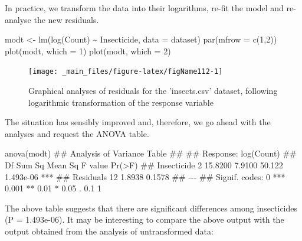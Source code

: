 \documentclass[a4paper,12pt,oneside]{book}
\newenvironment{Shaded}{\begin{snugshade}}{\end{snugshade}}
\newcommand{\DecValTok}[1]{#1}
\newcommand{\SpecialCharTok}[1]{#1}
\newcommand{\DocumentationTok}[1]{#1}
\newcommand{\OtherTok}[1]{#1}
\newcommand{\FunctionTok}[1]{#1}
\newcommand{\AttributeTok}[1]{#1}
\newcommand{\NormalTok}[1]{#1}
\begin{document}
In practice, we transform the data into their logarithms, re-fit the model and re-analyse the new residuals.

\begin{Shaded}
\begin{Highlighting}[]
\NormalTok{modt }\OtherTok{\textless{}{-}} \FunctionTok{lm}\NormalTok{(}\FunctionTok{log}\NormalTok{(Count) }\SpecialCharTok{\textasciitilde{}}\NormalTok{ Insecticide, }\AttributeTok{data =}\NormalTok{ dataset)}
\FunctionTok{par}\NormalTok{(}\AttributeTok{mfrow =} \FunctionTok{c}\NormalTok{(}\DecValTok{1}\NormalTok{,}\DecValTok{2}\NormalTok{))}
\FunctionTok{plot}\NormalTok{(modt, }\AttributeTok{which =} \DecValTok{1}\NormalTok{)}
\FunctionTok{plot}\NormalTok{(modt, }\AttributeTok{which =} \DecValTok{2}\NormalTok{)}
\end{Highlighting}
\end{Shaded}

\begin{figure}

{\centering \texttt{[image: \_main\_files/figure-latex/figName112-1]} 

}

\caption{Graphical analyses of residuals for the 'insects.csv' dataset, following logarithmic transformation of the response variable}\label{fig:figName112}
\end{figure}

The situation has sensibly improved and, therefore, we go ahead with the analyses and request the ANOVA table.

\begin{Shaded}
\begin{Highlighting}[]
\FunctionTok{anova}\NormalTok{(modt)}
\DocumentationTok{\#\# Analysis of Variance Table}
\DocumentationTok{\#\# }
\DocumentationTok{\#\# Response: log(Count)}
\DocumentationTok{\#\#             Df  Sum Sq Mean Sq F value    Pr(\textgreater{}F)    }
\DocumentationTok{\#\# Insecticide  2 15.8200  7.9100  50.122 1.493e{-}06 ***}
\DocumentationTok{\#\# Residuals   12  1.8938  0.1578                      }
\DocumentationTok{\#\# {-}{-}{-}}
\DocumentationTok{\#\# Signif. codes:  0 \textquotesingle{}***\textquotesingle{} 0.001 \textquotesingle{}**\textquotesingle{} 0.01 \textquotesingle{}*\textquotesingle{} 0.05 \textquotesingle{}.\textquotesingle{} 0.1 \textquotesingle{} \textquotesingle{} 1}
\end{Highlighting}
\end{Shaded}

The above table suggests that there are significant differences among insecticides (P = 1.493e-06). It may be interesting to compare the above output with the output obtained from the analysis of untransformed data:
\end{document}
